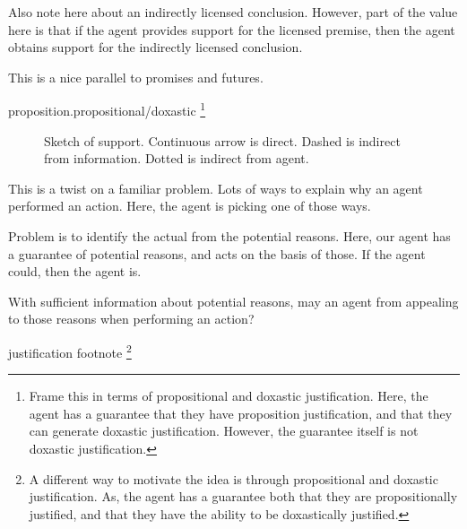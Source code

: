 \documentclass[10pt]{article}
\begin{document}
\begin{note}
  Also note here about an indirectly licensed conclusion.
  However, part of the value here is that if the agent provides support for the licensed premise, then the agent obtains support for the indirectly licensed conclusion.

  This is a nice parallel to promises and futures.
\end{note}



\begin{note}
  proposition.propositional/doxastic\nolinebreak
  \footnote{
    Frame this in terms of propositional and doxastic justification.
    Here, the agent has a guarantee that they have proposition justification, and that they can generate doxastic justification.
    However, the guarantee itself is not doxastic justification. }
\end{note}

\begin{figure}[h]
  \centering
\caption{Sketch of support.
  Continuous arrow is direct.
  Dashed is indirect from information.
  Dotted is indirect from agent.}
\label{fig:dynamics}
\end{figure}


\begin{note}
  This is a twist on a familiar problem.
  Lots of ways to explain why an agent performed an action.
  Here, the agent is picking one of those ways.

  Problem is to identify the actual from the potential reasons.
  Here, our agent has a guarantee of potential reasons, and acts on the basis of those.
  If the agent could, then the agent is.

  With sufficient information about potential reasons, may an agent from appealing to those reasons when performing an action?

  justification footnote\nolinebreak
  \footnote{
    A different way to motivate the idea is through propositional and doxastic justification.
    As, the agent has a guarantee both that they are propositionally justified, and that they have the ability to be doxastically justified.
  }
\end{note}
\end{document}
